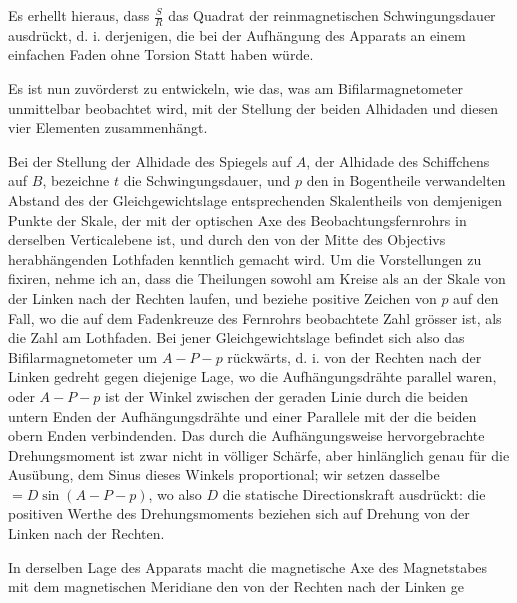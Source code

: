 Es erhellt hieraus, dass $\frac{S}{R}$ das Quadrat der reinmagnetischen Schwingungsdauer ausdrückt, d. i. derjenigen, die bei der Aufhängung des Apparats an einem einfachen Faden ohne Torsion Statt haben würde.

Es ist nun zuvörderst zu entwickeln, wie das, was am Bifilarmagnetometer unmittelbar beobachtet wird, mit der Stellung der beiden Alhidaden und diesen vier Elementen zusammenhängt.

Bei der Stellung der Alhidade des Spiegels auf $A$, der Alhidade des Schiffchens auf $B$, bezeichne $t$ die Schwingungsdauer, und $p$ den in Bogentheile verwandelten Abstand des der Gleichgewichtslage entsprechenden Skalentheils von demjenigen Punkte der Skale, der mit der optischen Axe des Beobachtungsfernrohrs in derselben Verticalebene ist, und durch den von der Mitte des Objectivs herabhängenden Lothfaden kenntlich gemacht wird. Um die Vorstellungen zu fixiren, nehme ich an, dass die Theilungen sowohl am Kreise als an der Skale von der Linken nach der Rechten laufen, und beziehe positive Zeichen von $p$ auf den Fall, wo die auf dem Fadenkreuze des Fernrohrs beobachtete Zahl grösser ist, als die Zahl am Lothfaden. Bei jener Gleichgewichtslage befindet sich also das Bifilarmagnetometer um $A-P-p$ rückwärts, d. i. von der Rechten nach der Linken gedreht gegen diejenige Lage, wo die Aufhängungsdrähte parallel waren, oder $A-P-p$ ist der Winkel zwischen der geraden Linie durch die beiden untern Enden der Aufhängungsdrähte und einer Parallele mit der die beiden obern Enden verbindenden. Das durch die Aufhängungsweise hervorgebrachte Drehungsmoment ist zwar nicht in völliger Schärfe, aber hinlänglich genau für die Ausübung, dem Sinus dieses Winkels proportional; wir setzen dasselbe $=D\sin(A-P-p)$, wo also $D$ die statische Directionskraft ausdrückt: die positiven Werthe des Drehungsmoments beziehen sich auf Drehung von der Linken nach der Rechten.

In derselben Lage des Apparats macht die magnetische Axe des Magnetstabes mit dem magnetischen Meridiane den von der Rechten nach der Linken ge%

